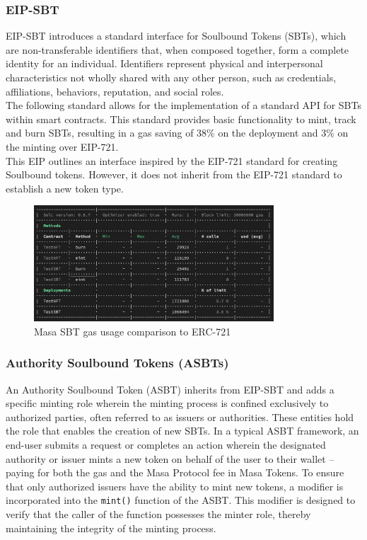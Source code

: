 \documentclass{article}
\begin{document}
\subsubsection{EIP-SBT}
EIP-SBT introduces a standard interface for Soulbound Tokens (SBTs), which are non-transferable identifiers that, when composed together, form a complete identity for an individual. Identifiers represent physical and interpersonal characteristics not wholly shared with any other person, such as credentials, affiliations, behaviors, reputation, and social roles. 
\\
\newline
The following standard allows for the implementation of a standard API for SBTs within smart contracts. This standard provides basic functionality to mint, track and burn SBTs, resulting in a gas saving of 38\% on the deployment and 3\% on the minting over EIP-721.
\\
\newline
This EIP outlines an interface inspired by the EIP-721 standard for creating Soulbound tokens. However, it does not inherit from the EIP-721 standard to establish a new token type.
\begin{figure}[h]
    \centering
    \includegraphics[width=0.8\textwidth]{gas-usage.png}
    \caption{Masa SBT gas usage comparison to ERC-721}
  \end{figure}
\subsubsection{Authority Soulbound Tokens (ASBTs)}

An Authority Soulbound Token (ASBT) inherits from EIP-SBT and adds a specific minting role wherein the minting process is confined exclusively to authorized parties, often referred to as issuers or authorities. These entities hold the role that enables the creation of new SBTs. In a typical ASBT framework, an end-user submits a request or completes an action wherein the designated authority or issuer mints a new token on behalf of the user to their wallet – paying for both the gas and the Masa Protocol fee in Masa Tokens. To ensure that only authorized issuers have the ability to mint new tokens, a modifier is incorporated into the \texttt{mint()} function of the ASBT. This modifier is designed to verify that the caller of the function possesses the minter role, thereby maintaining the integrity of the minting process.
\end{document}
